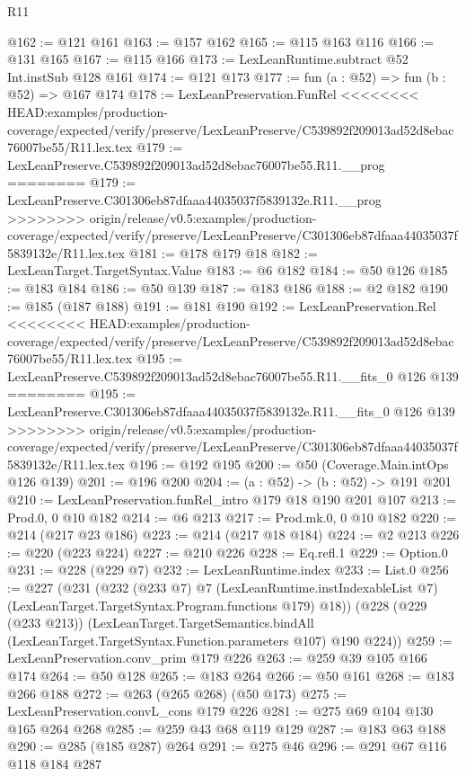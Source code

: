 \begin{lexlean}{R11}
\begin{coremodule}
{{{{{@162 := @121 @161
@163 := @157 @162
@165 := @115 @163 @116
@166 := @131 @165
@167 := @115 @166
@173 := LexLeanRuntime.subtract @52 Int.instSub @128 @161
@174 := @121 @173
@177 := fun (a : @52) => fun (b : @52) => @167 @174
@178 := LexLeanPreservation.FunRel
<<<<<<<< HEAD:examples/production-coverage/expected/verify/preserve/LexLeanPreserve/C539892f209013ad52d8ebac76007be55/R11.lex.tex
@179 := LexLeanPreserve.C539892f209013ad52d8ebac76007be55.R11.__prog
========
@179 := LexLeanPreserve.C301306eb87dfaaa44035037f5839132e.R11.__prog
>>>>>>>> origin/release/v0.5:examples/production-coverage/expected/verify/preserve/LexLeanPreserve/C301306eb87dfaaa44035037f5839132e/R11.lex.tex
@181 := @178 @179 @18
@182 := LexLeanTarget.TargetSyntax.Value
@183 := @6 @182
@184 := @50 @126
@185 := @183 @184
@186 := @50 @139
@187 := @183 @186
@188 := @2 @182
@190 := @185 (@187 @188)
@191 := @181 @190
@192 := LexLeanPreservation.Rel
<<<<<<<< HEAD:examples/production-coverage/expected/verify/preserve/LexLeanPreserve/C539892f209013ad52d8ebac76007be55/R11.lex.tex
@195 := LexLeanPreserve.C539892f209013ad52d8ebac76007be55.R11.__fits_0 @126 @139
========
@195 := LexLeanPreserve.C301306eb87dfaaa44035037f5839132e.R11.__fits_0 @126 @139
>>>>>>>> origin/release/v0.5:examples/production-coverage/expected/verify/preserve/LexLeanPreserve/C301306eb87dfaaa44035037f5839132e/R11.lex.tex
@196 := @192 @195
@200 := @50 (Coverage.Main.intOps @126 @139)
@201 := @196 @200
@204 := (a : @52) -> (b : @52) -> @191 @201
@210 := LexLeanPreservation.funRel_intro @179 @18 @190 @201 @107
@213 := Prod.{0, 0} @10 @182
@214 := @6 @213
@217 := Prod.mk.{0, 0} @10 @182
@220 := @214 (@217 @23 @186)
@223 := @214 (@217 @18 @184)
@224 := @2 @213
@226 := @220 (@223 @224)
@227 := @210 @226
@228 := Eq.refl.{1}
@229 := Option.{0}
@231 := @228 (@229 @7)
@232 := LexLeanRuntime.index
@233 := List.{0}
@256 := @227
    (@231
      (@232
        (@233 @7)
        @7
        (LexLeanRuntime.instIndexableList @7)
        (LexLeanTarget.TargetSyntax.Program.functions @179)
        @18))
    (@228
      (@229 (@233 @213))
      (LexLeanTarget.TargetSemantics.bindAll
        (LexLeanTarget.TargetSyntax.Function.parameters @107)
        @190
        @224))
@259 := LexLeanPreservation.conv_prim @179 @226
@263 := @259 @39 @105 @166 @174
@264 := @50 @128
@265 := @183 @264
@266 := @50 @161
@268 := @183 @266 @188
@272 := @263 (@265 @268) (@50 @173)
@275 := LexLeanPreservation.convL_cons @179 @226
@281 := @275 @69 @104 @130 @165 @264 @268
@285 := @259 @43 @68 @119 @129
@287 := @183 @63 @188
@290 := @285 (@185 @287) @264
@291 := @275 @46
@296 := @291 @67 @116 @118 @184 @287
}}}}}
\end{coremodule}
\end{lexlean}
